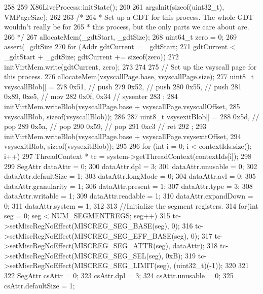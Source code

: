 \begin{DoxyCode}
258 {
259     X86LiveProcess::initState();
260 
261     argsInit(sizeof(uint32_t), VMPageSize);
262 
263     /* 
264      * Set up a GDT for this process. The whole GDT wouldn't really be for
265      * this process, but the only parts we care about are.
266      */
267     allocateMem(_gdtStart, _gdtSize);
268     uint64_t zero = 0;
269     assert(_gdtSize %
270     for (Addr gdtCurrent = _gdtStart;
271             gdtCurrent < _gdtStart + _gdtSize; gdtCurrent += sizeof(zero)) {
272         initVirtMem.write(gdtCurrent, zero);
273     }
274 
275     // Set up the vsyscall page for this process.
276     allocateMem(vsyscallPage.base, vsyscallPage.size);
277     uint8_t vsyscallBlob[] = {
278         0x51,       // push %
279         0x52,       // push %
280         0x55,       // push %
281         0x89, 0xe5, // mov %
282         0x0f, 0x34  // sysenter
283     };
284     initVirtMem.writeBlob(vsyscallPage.base + vsyscallPage.vsyscallOffset,
285             vsyscallBlob, sizeof(vsyscallBlob));
286 
287     uint8_t vsysexitBlob[] = {
288         0x5d,       // pop %
289         0x5a,       // pop %
290         0x59,       // pop %
291         0xc3        // ret
292     };
293     initVirtMem.writeBlob(vsyscallPage.base + vsyscallPage.vsysexitOffset,
294             vsysexitBlob, sizeof(vsysexitBlob));
295 
296     for (int i = 0; i < contextIds.size(); i++) {
297         ThreadContext * tc = system->getThreadContext(contextIds[i]);
298 
299         SegAttr dataAttr = 0;
300         dataAttr.dpl = 3;
301         dataAttr.unusable = 0;
302         dataAttr.defaultSize = 1;
303         dataAttr.longMode = 0;
304         dataAttr.avl = 0;
305         dataAttr.granularity = 1;
306         dataAttr.present = 1;
307         dataAttr.type = 3;
308         dataAttr.writable = 1;
309         dataAttr.readable = 1;
310         dataAttr.expandDown = 0;
311         dataAttr.system = 1;
312 
313         //Initialize the segment registers.
314         for(int seg = 0; seg < NUM_SEGMENTREGS; seg++) {
315             tc->setMiscRegNoEffect(MISCREG_SEG_BASE(seg), 0);
316             tc->setMiscRegNoEffect(MISCREG_SEG_EFF_BASE(seg), 0);
317             tc->setMiscRegNoEffect(MISCREG_SEG_ATTR(seg), dataAttr);
318             tc->setMiscRegNoEffect(MISCREG_SEG_SEL(seg), 0xB);
319             tc->setMiscRegNoEffect(MISCREG_SEG_LIMIT(seg), (uint32_t)(-1));
320         }
321 
322         SegAttr csAttr = 0;
323         csAttr.dpl = 3;
324         csAttr.unusable = 0;
325         csAttr.defaultSize = 1;
}}
\end{DoxyCode}
